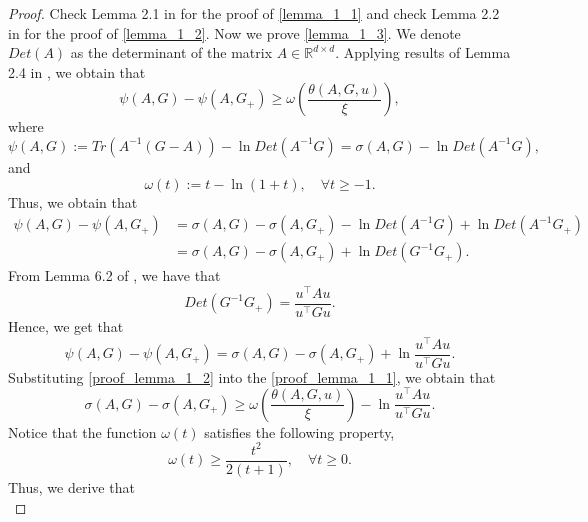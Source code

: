 \documentclass[11pt]{article}
\numberwithin{assumption}{section}
\numberwithin{remark}{section}
\numberwithin{theorem}{section}
\begin{document}
\begin{proof}

Check Lemma 2.1 in \cite{rodomanov2020rates} for the proof of \eqref{lemma_1_1} and check Lemma 2.2 in \cite{rodomanov2020rates} for the proof of \eqref{lemma_1_2}. Now we prove \eqref{lemma_1_3}. We denote $Det(A)$ as the determinant of the matrix $A \in \mathbb{R}^{d \times d}$. Applying results of Lemma 2.4 in \cite{rodomanov2020rates}, we obtain that
\begin{equation}\label{proof_lemma_1_1}
    \psi(A, G) - \psi(A, G_{+}) \geq \omega(\frac{\theta(A, G, u)}{\xi}),
\end{equation}
where
\begin{equation}
\psi(A, G) := Tr(A^{-1}(G - A)) - \ln{Det(A^{-1}G)} = \sigma(A, G) - \ln{Det(A^{-1}G)},
\end{equation}
and
\begin{equation}
\omega(t) := t - \ln(1 + t), \quad \forall t \geq -1.
\end{equation}
Thus, we obtain that
\begin{equation}
\begin{split}
    \psi(A, G) - \psi(A, G_{+}) & =  \sigma(A, G) - \sigma(A, G_{+}) - \ln{Det(A^{-1}G)} + \ln{Det(A^{-1}G_{+})}\\
    & = \sigma(A, G) -  \sigma(A, G_{+}) + \ln{Det(G^{-1}G_{+})}.
\end{split}
\end{equation}
From Lemma 6.2 of \cite{rodomanov2020rates}, we have that
\begin{equation}
    Det(G^{-1}G_{+}) = \frac{u^\top Au}{u^\top Gu}.
\end{equation}
Hence, we get that
\begin{equation}\label{proof_lemma_1_2}
    \psi(A, G) - \psi(A, G_{+})  =  \sigma(A, G) - \sigma(A, G_{+}) + \ln{\frac{u^\top Au}{u^\top Gu}}.
\end{equation}
Substituting \eqref{proof_lemma_1_2} into the \eqref{proof_lemma_1_1}, we obtain that
\begin{equation}\label{proof_lemma_1_3}
\sigma(A, G) - \sigma(A, G_{+}) \geq \omega(\frac{\theta(A, G, u)}{\xi}) - \ln{\frac{u^\top Au}{u^\top Gu}}.
\end{equation}
Notice that the function $\omega(t)$ satisfies the following property,
\begin{equation}
\omega(t) \geq \frac{t^2}{2(t + 1)}, \quad \forall t \geq 0.
\end{equation}
Thus, we derive that
\begin{equation}\label{proof_lemma_1_4}

\end{equation}
\end{proof}
\end{document}

